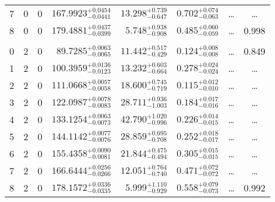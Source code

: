 \begin{table*}[!]
\begin{tabular}{llcrrlrc}
7 & 0 & 0 & $    167.9923_{-      0.0441}^{+      0.0454}$ & $      13.298_{-       0.647}^{+       0.739}$ & $       0.702_{-       0.063}^{+       0.074}$ & \multicolumn{1}{c}{\dots} & \dots \\[1pt]
8 & 0 & 0 & $    179.4881_{-      0.0399}^{+      0.0437}$ & $       5.748_{-       0.908}^{+       0.938}$ & $       0.485_{-       0.059}^{+       0.060}$ & \multicolumn{1}{c}{\dots} & 0.998\\[1pt]
\hline \\[-8pt]
0 & 2 & 0 & $     89.7285_{-      0.0065}^{+      0.0063}$ & $      11.442_{-       0.429}^{+       0.517}$ & $       0.124_{-       0.008}^{+       0.008}$ & \multicolumn{1}{c}{\dots} & 0.849\\[1pt]
1 & 2 & 0 & $    100.3959_{-      0.0123}^{+      0.0136}$ & $      13.232_{-       0.664}^{+       0.603}$ & $       0.278_{-       0.024}^{+       0.024}$ & \multicolumn{1}{c}{\dots} & \dots \\[1pt]
2 & 2 & 0 & $    111.0668_{-      0.0058}^{+      0.0057}$ & $      18.600_{-       0.719}^{+       0.745}$ & $       0.115_{-       0.010}^{+       0.012}$ & \multicolumn{1}{c}{\dots} & \dots \\[1pt]
3 & 2 & 0 & $    122.0987_{-      0.0083}^{+      0.0078}$ & $      28.711_{-       1.003}^{+       0.936}$ & $       0.184_{-       0.016}^{+       0.017}$ & \multicolumn{1}{c}{\dots} & \dots \\[1pt]
4 & 2 & 0 & $    133.1254_{-      0.0073}^{+      0.0063}$ & $      42.790_{-       0.996}^{+       1.020}$ & $       0.226_{-       0.015}^{+       0.014}$ & \multicolumn{1}{c}{\dots} & \dots \\[1pt]
5 & 2 & 0 & $    144.1142_{-      0.0076}^{+      0.0077}$ & $      28.859_{-       0.708}^{+       0.695}$ & $       0.252_{-       0.017}^{+       0.018}$ & \multicolumn{1}{c}{\dots} & \dots \\[1pt]
6 & 2 & 0 & $    155.4358_{-      0.0081}^{+      0.0090}$ & $      21.844_{-       0.494}^{+       0.475}$ & $       0.305_{-       0.015}^{+       0.015}$ & \multicolumn{1}{c}{\dots} & \dots \\[1pt]
7 & 2 & 0 & $    166.6444_{-      0.0266}^{+      0.0256}$ & $      12.051_{-       0.740}^{+       0.764}$ & $       0.471_{-       0.072}^{+       0.072}$ & \multicolumn{1}{c}{\dots} & \dots \\[1pt]
8 & 2 & 0 & $    178.1572_{-      0.0335}^{+      0.0336}$ & $       5.999_{-       0.929}^{+       1.110}$ & $       0.558_{-       0.073}^{+       0.079}$ & \multicolumn{1}{c}{\dots} & 0.992 \\[1pt]

\end{tabular}
\end{table*}

